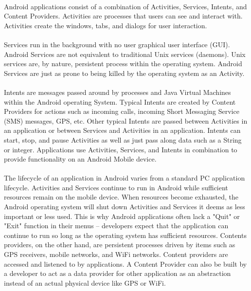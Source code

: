 		\paragraph{} Android applications consist of a combination of Activities, Services, Intents, and Content Providers.  Activities are processes that users can see and interact with. Activities create the windows, tabs, and dialogs for user interaction.  
		\paragraph{}Services run in the background with no user graphical user interface (GUI). Android Services are not equivalent to traditional Unix services (daemons).  Unix services are, by nature, persistent process within the operating system.  Android Services are just as prone to being killed by the operating system as an Activity. 
		\paragraph{}Intents are messages passed around by processes and Java Virtual Machines within the Android operating System. Typical Intents are created by Content Providers for actions such as incoming calls, incoming Short Messaging Service (SMS) messages, GPS, etc.  Other typical Intents are passed between Activities in an application or between Services and Activities in an application.  Intents can start, stop, and pause Activities as well as just pass along data such as a String or integer. Applications use Activities, Services, and Intents in combination to provide functionality on an Android Mobile device.  
		\paragraph{} The lifecycle of an application in Android varies from a standard PC application lifecycle. Activities and Services continue to run in Android while sufficient resources remain on the mobile device.  When resources become exhausted, the Android operating system will shut down Activities and Services it deems as less important or less used.  This is why Android applications often lack a "Quit" or "Exit" function in their menus -- developers expect that the application can continue to run so long as the operating system has sufficient resources.  Contents providers, on the other hand, are persistent processes driven by items such as GPS receivers, mobile networks, and WiFi networks.  Content providers are accessed and listened to by applications.  A Content Provider can also be built by a developer to act as a data provider for other application as an abstraction instead of an actual physical device like GPS or WiFi.\cite{murphy_busy_2010}

